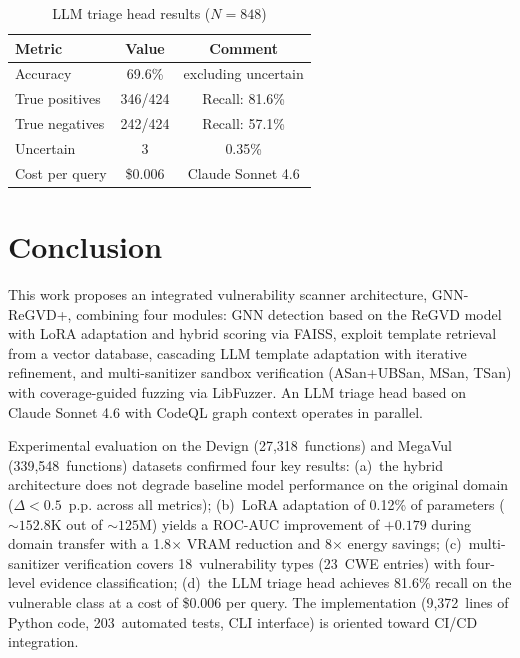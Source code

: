 \documentclass[runningheads]{llncs}
\begin{document}
\begin{table}
\centering
\caption{LLM triage head results ($N = 848$)}
\label{tab:llm_triage}
\small
\begin{tabular}{|l|c|c|}
\hline
\textbf{Metric} & \textbf{Value} & \textbf{Comment} \\
\hline
Accuracy & 69.6\% & excluding uncertain \\
True positives & 346/424 & Recall: 81.6\% \\
True negatives & 242/424 & Recall: 57.1\% \\
Uncertain & 3 & 0.35\% \\
Cost per query & \$0.006 & Claude Sonnet 4.6 \\
\hline
\end{tabular}
\end{table}


\section{Conclusion}

This work proposes an integrated vulnerability scanner architecture, GNN-ReGVD+, combining four modules: GNN detection based on the ReGVD model with LoRA adaptation and hybrid scoring via FAISS, exploit template retrieval from a vector database, cascading LLM template adaptation with iterative refinement, and multi-sanitizer sandbox verification (ASan+UBSan, MSan, TSan) with coverage-guided fuzzing via LibFuzzer. An LLM triage head based on Claude Sonnet 4.6 with CodeQL graph context operates in parallel.

Experimental evaluation on the Devign (27,318~functions) and MegaVul (339,548~functions) datasets confirmed four key results: (a)~the hybrid architecture does not degrade baseline model performance on the original domain ($\Delta < 0.5$~p.p. across all metrics); (b)~LoRA adaptation of 0.12\% of parameters (${\sim}152.8$K out of ${\sim}125$M) yields a ROC-AUC improvement of $+0.179$ during domain transfer with a 1.8$\times$ VRAM reduction and 8$\times$ energy savings; (c)~multi-sanitizer verification covers 18~vulnerability types (23~CWE entries) with four-level evidence classification; (d)~the LLM triage head achieves 81.6\% recall on the vulnerable class at a cost of \$0.006 per query. The implementation (9,372~lines of Python code, 203~automated tests, CLI interface) is oriented toward CI/CD integration.
\end{document}
